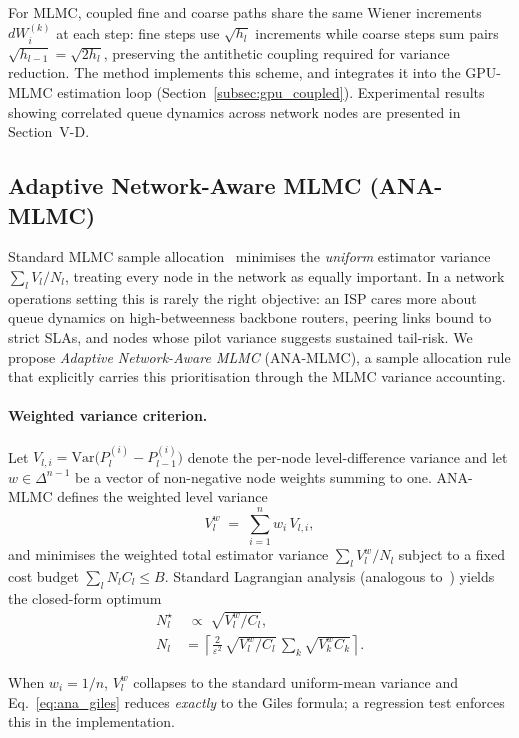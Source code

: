 \documentclass[pdflatex,sn-mathphys-num]{sn-jnl}
\theoremstyle{thmstyleone}%
\theoremstyle{thmstyletwo}%
\theoremstyle{thmstylethree}%
\begin{document}
For MLMC, coupled fine and coarse paths share the same Wiener increments $dW_i^{(k)}$ at each
step: fine steps use $\sqrt{h_l}$ increments while coarse steps sum pairs
$\sqrt{h_{l-1}} = \sqrt{2h_l}$, preserving the antithetic coupling required for variance
reduction. The  method implements this
scheme, and  integrates it into the GPU-MLMC estimation loop
(Section~\ref{subsec:gpu_coupled}). Experimental results showing correlated queue dynamics across
network nodes are presented in Section~V-D.

\subsection{Adaptive Network-Aware MLMC (ANA-MLMC)}
\label{subsec:ana_mlmc}

Standard MLMC sample allocation~\cite{giles2015multilevel} minimises the \emph{uniform}
estimator variance $\sum_l V_l/N_l$, treating every node in the network as equally important.
In a network operations setting this is rarely the right objective: an ISP cares more about queue
dynamics on high-betweenness backbone routers, peering links bound to strict SLAs, and nodes
whose pilot variance suggests sustained tail-risk. We propose \emph{Adaptive Network-Aware MLMC}
(ANA-MLMC), a sample allocation rule that explicitly carries this prioritisation through the MLMC
variance accounting.

\paragraph{Weighted variance criterion.}
Let $V_{l,i} = \mathrm{Var}\bigl(P_l^{(i)} - P_{l-1}^{(i)}\bigr)$ denote the per-node
level-difference variance and let $w \in \Delta^{n-1}$ be a vector of non-negative node weights
summing to one. ANA-MLMC defines the weighted level variance
\begin{equation}
    V_l^{w} \;=\; \sum_{i=1}^{n} w_i\, V_{l,i},
    \label{eq:ana_var}
\end{equation}
and minimises the weighted total estimator variance $\sum_l V_l^{w}/N_l$ subject to a fixed cost
budget $\sum_l N_l C_l \le B$. Standard Lagrangian analysis (analogous
to~\cite{giles2015multilevel}) yields the closed-form optimum
\begin{align}
    N_l^{\star} &\;\propto\; \sqrt{V_l^{w}/C_l}, \nonumber \\
    N_l &= \left\lceil \tfrac{2}{\varepsilon^{2}}\,
    \sqrt{V_l^{w}/C_l}\, \sum_k \sqrt{V_k^{w} C_k} \right\rceil .
    \label{eq:ana_giles}
\end{align}
\begin{sloppypar}
When $w_i = 1/n$, $V_l^{w}$ collapses to the standard uniform-mean variance and
Eq.~\eqref{eq:ana_giles} reduces \emph{exactly} to the Giles formula; a regression test
enforces this in the implementation.
\end{sloppypar}
\end{document}
